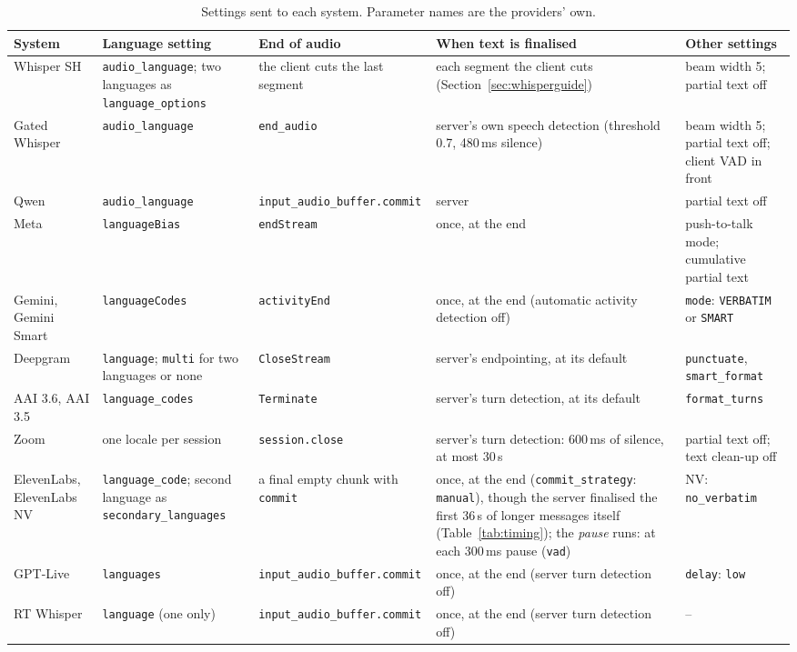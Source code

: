 \documentclass[11pt]{article}
\begin{document}
\begin{table}[!htbp]
\centering\scriptsize
\begin{adjustbox}{max width=\textwidth}
\begin{tabular}{@{}>{\raggedright\arraybackslash}p{2.0cm}>{\raggedright\arraybackslash}p{3.3cm}>{\raggedright\arraybackslash}p{3.4cm}>{\raggedright\arraybackslash}p{4.3cm}>{\raggedright\arraybackslash}p{3.4cm}@{}}
\toprule
System & Language setting & End of audio & When text is finalised & Other settings \\
\midrule
Whisper SH & \texttt{audio\_language}; two languages as \texttt{language\_\allowbreak options} & the client cuts the last segment & each segment the client cuts (Section~\ref{sec:whisperguide}) & beam width 5; partial text off \\
Gated Whisper & \texttt{audio\_language} & \texttt{end\_audio} & server's own speech detection (threshold 0.7, 480\,ms silence) & beam width 5; partial text off; client VAD in front \\
Qwen & \texttt{audio\_language} & \texttt{input\_audio\_buffer\allowbreak.commit} & server & partial text off \\
Meta & \texttt{languageBias} & \texttt{endStream} & once, at the end & push-to-talk mode; cumulative partial text \\
Gemini, Gemini Smart & \texttt{languageCodes} & \texttt{activityEnd} & once, at the end (automatic activity detection off) & \texttt{mode}: \texttt{VERBATIM} or \texttt{SMART} \\
Deepgram & \texttt{language}; \texttt{multi} for two languages or none & \texttt{CloseStream} & server's endpointing, at its default & \texttt{punctuate}, \texttt{smart\_format} \\
AAI 3.6, AAI 3.5 & \texttt{language\_codes} & \texttt{Terminate} & server's turn detection, at its default & \texttt{format\_turns} \\
Zoom & one locale per session & \texttt{session.close} & server's turn detection: 600\,ms of silence, at most 30\,s & partial text off; text clean-up off \\
ElevenLabs, ElevenLabs NV & \texttt{language\_code}; second language as \texttt{secondary\_\allowbreak languages} & a final empty chunk with \texttt{commit} & once, at the end (\texttt{commit\_strategy}: \texttt{manual}), though the server finalised the first 36\,s of longer messages itself (Table~\ref{tab:timing}); the \emph{pause} runs: at each 300\,ms pause (\texttt{vad}) & NV: \texttt{no\_verbatim} \\
GPT-Live & \texttt{languages} & \texttt{input\_audio\_buffer\allowbreak.commit} & once, at the end (server turn detection off) & \texttt{delay}: \texttt{low} \\
RT Whisper & \texttt{language} (one only) & \texttt{input\_audio\_buffer\allowbreak.commit} & once, at the end (server turn detection off) & -- \\
\bottomrule
\end{tabular}
\end{adjustbox}
\caption{Settings sent to each system. Parameter names are the providers' own.}
\label{tab:settings}
\end{table}
\end{document}
